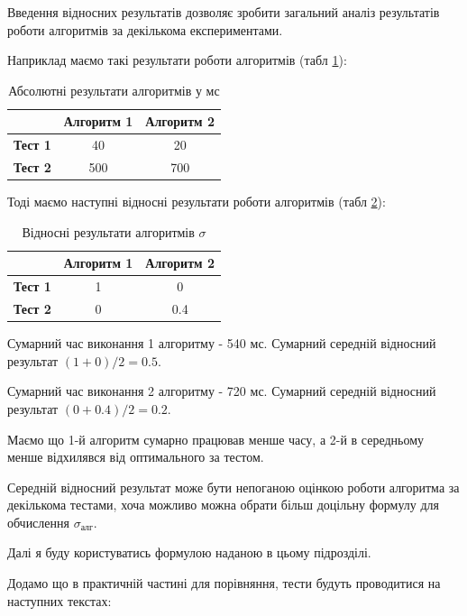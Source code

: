 \documentclass[a4paper,14pt]{extarticle} %
\begin{document}
	Введення відносних результатів дозволяє зробити загальний аналіз результатів роботи алгоритмів за декількома експериментами.

	Наприклад маємо такі результати роботи алгоритмів (табл \ref{table:times}):
	\begin{table}[H]
		\centering
		\begin{tabular}{|c|c|c|}
			\hline
			& \textbf{Алгоритм 1} & \textbf{Алгоритм 2} \\ 
			\hline
			\textbf{Тест 1} & 40 & 20 \\ 
			\hline
			\textbf{Тест 2} & 500 & 700 \\ 
			\hline
		\end{tabular}
		\caption{Абсолютні результати алгоритмів у мс}
		\label{table:times}
	\end{table}

	Тоді маємо наступні відносні результати роботи алгоритмів (табл \ref{table:relative_times}):
	\begin{table}[H]
		\centering
		\begin{tabular}{|c|c|c|}
			\hline
			& \textbf{Алгоритм 1} & \textbf{Алгоритм 2} \\ 
			\hline
			\textbf{Тест 1} & 1 & 0 \\ 
			\hline
			\textbf{Тест 2} & 0 & 0.4 \\ 
			\hline
		\end{tabular}
		\caption{Відносні результати алгоритмів $\sigma$}
		\label{table:relative_times}
	\end{table}

	Сумарний час виконання 1 алгоритму - 540 мс. Сумарний середній відносний результат $(1+0)/2=0.5$.

	Сумарний час виконання 2 алгоритму - 720 мс. Сумарний середній відносний результат $(0+0.4)/2=0.2$.

	Маємо що 1-й алгоритм сумарно працював менше часу, а 2-й в середньому менше відхилявся від оптимального за тестом.

	Середній відносний результат може бути непоганою оцінкою роботи алгоритма за декількома тестами, хоча можливо можна обрати більш доцільну формулу для обчислення $\sigma_{\text{алг}}$.

	Далі я буду користуватись формулою наданою в цьому підрозділі.

	Додамо що в практичній частині для порівняння, тести будуть проводитися на наступних текстах:
\end{document}
